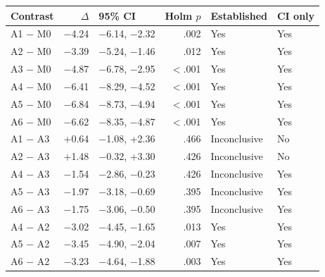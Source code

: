 \footnotesize
\setlength{\tabcolsep}{2pt}
\begin{tabular}{@{}lrlrll@{}}
\toprule
Contrast & $\Delta$ & 95\% CI & Holm $p$ & Established & CI only \\
\midrule
A1 $-$ M0 & $-$4.24 & $-$6.14, $-$2.32 & .002 & Yes & Yes \\
A2 $-$ M0 & $-$3.39 & $-$5.24, $-$1.46 & .012 & Yes & Yes \\
A3 $-$ M0 & $-$4.87 & $-$6.78, $-$2.95 & $<$.001 & Yes & Yes \\
A4 $-$ M0 & $-$6.41 & $-$8.29, $-$4.52 & $<$.001 & Yes & Yes \\
A5 $-$ M0 & $-$6.84 & $-$8.73, $-$4.94 & $<$.001 & Yes & Yes \\
A6 $-$ M0 & $-$6.62 & $-$8.35, $-$4.87 & $<$.001 & Yes & Yes \\
\midrule
A1 $-$ A3 & +0.64 & $-$1.08, +2.36 & .466 & Inconclusive & No \\
A2 $-$ A3 & +1.48 & $-$0.32, +3.30 & .426 & Inconclusive & No \\
A4 $-$ A3 & $-$1.54 & $-$2.86, $-$0.23 & .426 & Inconclusive & Yes \\
A5 $-$ A3 & $-$1.97 & $-$3.18, $-$0.69 & .395 & Inconclusive & Yes \\
A6 $-$ A3 & $-$1.75 & $-$3.06, $-$0.50 & .395 & Inconclusive & Yes \\
\midrule
A4 $-$ A2 & $-$3.02 & $-$4.45, $-$1.65 & .013 & Yes & Yes \\
A5 $-$ A2 & $-$3.45 & $-$4.90, $-$2.04 & .007 & Yes & Yes \\
A6 $-$ A2 & $-$3.23 & $-$4.64, $-$1.88 & .003 & Yes & Yes \\
\bottomrule
\end{tabular}
